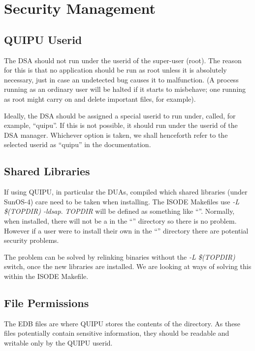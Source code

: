 
\chapter{Security Management}
\label{secman}

\section{QUIPU Userid}

The DSA should not run under the userid of the super-user (root). The
reason for this is that no application should be run as root unless it is
absolutely necessary, just in case an undetected bug causes it to malfunction.
(A process running as an ordinary user will be halted if it starts to
misbehave; one running as root might carry on and delete important files, for
example).

Ideally, the DSA should be assigned a special userid to run under, called,
for example, ``quipu''. If this is not possible, it should run under the
userid of the DSA manager. Whichever option is taken, we shall henceforth refer
to the selected userid as ``quipu'' in the documentation.

\section{Shared Libraries}

If using QUIPU, in particular the DUAs, compiled which shared
libraries (under SunOS-4) care need to be taken when installing.
The ISODE Makefiles use {\em -L \$(TOPDIR) -ldsap}.  {\em TOPDIR} will
be defined as something like ``''.  Normally, when
installed, there will not be a  in the ``''
directory so there is no problem.  However if a user were to install
their own  in the ``'' directory there are
potential security problems.

The problem can be solved by relinking binaries without the
{\em -L \$(TOPDIR)} switch, once the new libraries are installed.
We are looking at ways of solving this within the ISODE Makefile.

\section{File Permissions}

The EDB files are where QUIPU stores the contents of the directory. As these
files potentially contain sensitive information, they should be readable and
writable only by the QUIPU userid.


